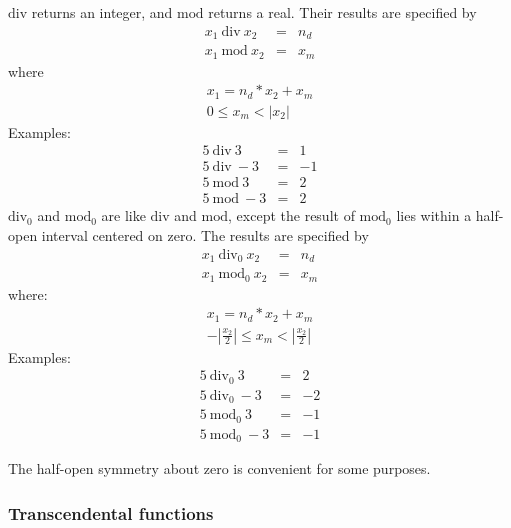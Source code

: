 $\mathrm{div}$ returns an integer, and $\mathrm{mod}$ returns a real.
Their results are specified by
%
\begin{eqnarray*}
x_1~\mathrm{div}~x_2 &=& n_d\\
x_1~\mathrm{mod}~x_2 &=& x_m
\end{eqnarray*}
%
where
%
\begin{displaymath}
\begin{array}{c}
x_1 = n_d * x_2 + x_m\\
0 \leq x_m < |x_2|
\end{array}
\end{displaymath}
%
Examples:
\begin{eqnarray*}
5~\mathrm{div}~3    &=&  1\\
5~\mathrm{div}~-3   &=&  -1\\
5~\mathrm{mod}~3    &=&  2\\
5~\mathrm{mod}~-3   &=&  2
\end{eqnarray*}
%
$\mathrm{div}_0$ and $\mathrm{mod}_0$ are like $\mathrm{div}$ and
$\mathrm{mod}$, except the result of $\mathrm{mod}_0$ lies within a
half-open interval centered on zero.  The results are specified by
%
\begin{eqnarray*}
x_1~\mathrm{div}_0~x_2 &=& n_d\\
x_1~\mathrm{mod}_0~x_2 &=& x_m
\end{eqnarray*}
%
where:
%
\begin{displaymath}
\begin{array}{c}
x_1 = n_d * x_2 + x_m\\
-|\frac{x_2}{2}| \leq x_m < |\frac{x_2}{2}|
\end{array}
\end{displaymath}
%
Examples:
%
\begin{eqnarray*}
5~\mathrm{div}_0~3    &=&  2\\
5~\mathrm{div}_0~-3   &=&  -2\\
5~\mathrm{mod}_0~3    &=&  -1\\
5~\mathrm{mod}_0~-3   &=&  -1
\end{eqnarray*}

\begin{rationale}
The half-open symmetry about zero is convenient for some purposes.
\end{rationale}

\subsubsection{Transcendental functions}
\label{transcendentalfunctions}

